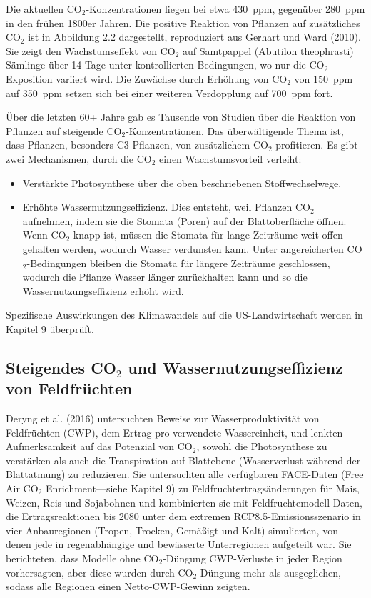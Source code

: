 \documentclass[12pt,paper=a4,DIV=12,parskip=never,chapterprefix=false,headings=standardclasses]{scrreprt}
\begin{document}
Die aktuellen CO$_2$-Konzentrationen liegen bei etwa \SI{430}{ppm}, gegenüber \SI{280}{ppm} in den frühen 1800er Jahren. Die positive Reaktion von Pflanzen auf zusätzliches CO$_2$ ist in Abbildung 2.2 dargestellt, reproduziert aus Gerhart und Ward (2010). Sie zeigt den Wachstumseffekt von CO$_2$ auf Samtpappel (Abutilon theophrasti) Sämlinge über 14 Tage unter kontrollierten Bedingungen, wo nur die CO$_2$-Exposition variiert wird. Die Zuwächse durch Erhöhung von CO$_2$ von \SI{150}{ppm} auf \SI{350}{ppm} setzen sich bei einer weiteren Verdopplung auf \SI{700}{ppm} fort.

Über die letzten 60+ Jahre gab es Tausende von Studien über die Reaktion von Pflanzen auf steigende CO$_2$-Konzentrationen. Das überwältigende Thema ist, dass Pflanzen, besonders C3-Pflanzen, von zusätzlichem CO$_2$ profitieren. Es gibt zwei Mechanismen, durch die CO$_2$ einen Wachstumsvorteil verleiht:

\begin{itemize}
\item Verstärkte Photosynthese über die oben beschriebenen Stoffwechselwege.
\item Erhöhte Wassernutzungseffizienz. Dies entsteht, weil Pflanzen CO$_2$ aufnehmen, indem sie die Stomata (Poren) auf der Blattoberfläche öffnen. Wenn CO$_2$ knapp ist, müssen die Stomata für lange Zeiträume weit offen gehalten werden, wodurch Wasser verdunsten kann. Unter angereicherten CO$_2$-Bedingungen bleiben die Stomata für längere Zeiträume geschlossen, wodurch die Pflanze Wasser länger zurückhalten kann und so die Wassernutzungseffizienz erhöht wird.
\end{itemize}

Spezifische Auswirkungen des Klimawandels auf die US-Landwirtschaft werden in Kapitel 9 überprüft.

\subsection{Steigendes CO$_2$ und Wassernutzungseffizienz von Feldfrüchten}

Deryng et al. (2016) untersuchten Beweise zur Wasserproduktivität von Feldfrüchten (CWP), dem Ertrag pro verwendete Wassereinheit, und lenkten Aufmerksamkeit auf das Potenzial von CO$_2$, sowohl die Photosynthese zu verstärken als auch die Transpiration auf Blattebene (Wasserverlust während der Blattatmung) zu reduzieren. Sie untersuchten alle verfügbaren FACE-Daten (Free Air CO$_2$ Enrichment—siehe Kapitel 9) zu Feldfruchtertragsänderungen für Mais, Weizen, Reis und Sojabohnen und kombinierten sie mit Feldfruchtemodell-Daten, die Ertragsreaktionen bis 2080 unter dem extremen RCP8.5-Emissionsszenario in vier Anbauregionen (Tropen, Trocken, Gemäßigt und Kalt) simulierten, von denen jede in regenabhängige und bewässerte Unterregionen aufgeteilt war. Sie berichteten, dass Modelle ohne CO$_2$-Düngung CWP-Verluste in jeder Region vorhersagten, aber diese wurden durch CO$_2$-Düngung mehr als ausgeglichen, sodass alle Regionen einen Netto-CWP-Gewinn zeigten.
\end{document}
